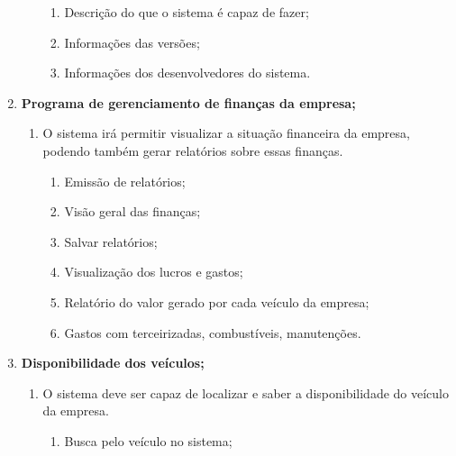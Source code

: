 \begin{enumerate}
\begin{enumerate}
                        \begin{enumerate}
                              \item Descrição do que o sistema é capaz de fazer;
                              \item Informações das versões;
                              \item Informações dos desenvolvedores do sistema.

                        \end{enumerate}
            \end{enumerate}
      \item \textbf{Programa de gerenciamento de finanças da empresa;}
            \begin{enumerate}

                  \item	O sistema irá permitir visualizar a situação financeira da empresa, podendo também
                        gerar relatórios sobre essas finanças.

                        \begin{enumerate}
                              \item Emissão de relatórios;
                              \item Visão geral das finanças;
                              \item Salvar relatórios;
                              \item Visualização dos lucros e gastos;
                              \item Relatório do valor gerado por cada veículo da empresa;
                              \item Gastos com terceirizadas, combustíveis, manutenções.

                        \end{enumerate}
            \end{enumerate}
      \item \textbf{Disponibilidade dos veículos;}
            \begin{enumerate}

                  \item	O sistema deve ser capaz de localizar e saber a disponibilidade do veículo da empresa.
                        \begin{enumerate}
                              \item Busca pelo veículo no sistema;


\end{enumerate}
\end{enumerate}
\end{enumerate}

